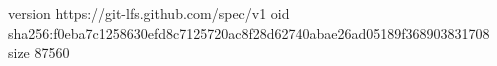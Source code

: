 version https://git-lfs.github.com/spec/v1
oid sha256:f0eba7c1258630efd8c7125720ac8f28d62740abae26ad05189f368903831708
size 87560
